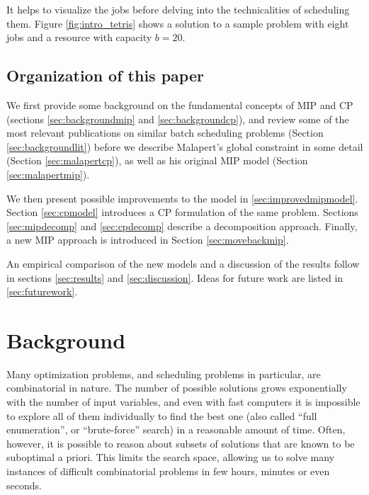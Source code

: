\documentclass[13pt, letterpaper, oneside]{book}
\begin{document}
It helps to visualize the jobs before delving into the technicalities of
scheduling them. Figure \ref{fig:intro_tetris} shows a solution to a sample
problem with eight jobs and a resource with capacity $b = 20$.


\section{Organization of this paper}
We first provide some background on the fundamental concepts of MIP and CP
(sections \ref{sec:backgroundmip} and \ref{sec:backgroundcp}), and
review some of the most relevant publications on similar batch scheduling
problems (Section \ref{sec:backgroundlit}) before we describe Malapert's global
constraint in some detail (Section \ref{sec:malapertcp}), as well as his
original MIP model (Section \ref{sec:malapertmip}).

We then present possible improvements to the
model in \ref{sec:improvedmipmodel}. Section \ref{sec:cpmodel} introduces a CP
formulation of the same problem. Sections \ref{sec:mipdecomp} and
\ref{sec:cpdecomp} describe a decomposition approach. Finally, a new MIP approach
is introduced in Section \ref{sec:movebackmip}.

An empirical comparison of the new models and a discussion of the results follow in
sections \ref{sec:results} and \ref{sec:discussion}. Ideas for future work are
listed in \ref{sec:futurework}.


\chapter{Background}
Many optimization problems, and scheduling problems in particular, are
combinatorial in nature. The number of possible solutions grows exponentially
with the number of input variables, and even with fast computers it is
impossible to explore all of them individually to find the best one
(also called ``full enumeration'', or ``brute-force'' search) in a reasonable
amount of time. Often, however, it is possible to reason about subsets of
solutions that are known to be suboptimal a priori. This limits the search
space, allowing us to solve many instances of difficult combinatorial problems
in few hours, minutes or even seconds.
\end{document}
